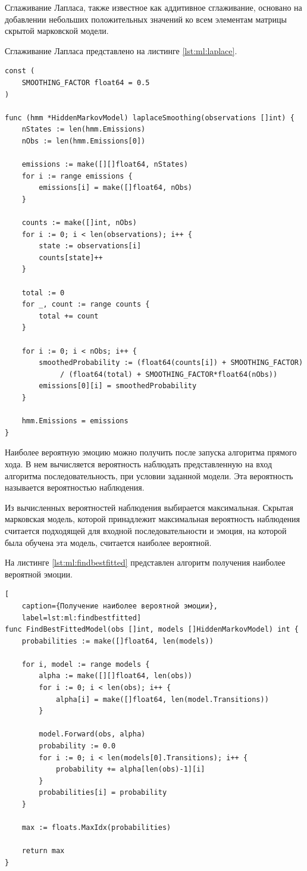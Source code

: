 Сглаживание Лапласа, также известное как аддитивное сглаживание, основано на добавлении небольших положительных значений ко всем элементам матрицы скрытой марковской модели.

Сглаживание Лапласа представлено на листинге \ref{lst:ml:laplace}.

\begin{lstlisting}[caption={Сглаживание Лапласа}, label=lst:ml:laplace]
const (
	SMOOTHING_FACTOR float64 = 0.5
)

func (hmm *HiddenMarkovModel) laplaceSmoothing(observations []int) {
	nStates := len(hmm.Emissions)
	nObs := len(hmm.Emissions[0])
	
	emissions := make([][]float64, nStates)
	for i := range emissions {
		emissions[i] = make([]float64, nObs)
	}
	
	counts := make([]int, nObs)
	for i := 0; i < len(observations); i++ {
		state := observations[i]
		counts[state]++
	}
	
	total := 0
	for _, count := range counts {
		total += count
	}
	
	for i := 0; i < nObs; i++ {
		smoothedProbability := (float64(counts[i]) + SMOOTHING_FACTOR)
			 / (float64(total) + SMOOTHING_FACTOR*float64(nObs))
		emissions[0][i] = smoothedProbability
	}
	
	hmm.Emissions = emissions
}
\end{lstlisting}

Наиболее вероятную эмоцию можно получить после запуска алгоритма прямого хода. В нем вычисляется вероятность наблюдать представленную на вход алгоритма последовательность, при условии заданной модели. Эта вероятность называется вероятностью наблюдения. 

Из вычисленных вероятностей наблюдения выбирается максимальная. Скрытая марковская модель, которой принадлежит максимальная вероятность наблюдения считается подходящей для входной последовательности и эмоция, на которой была обучена эта модель, считается наиболее вероятной.

На листинге  \ref{lst:ml:findbestfitted} представлен алгоритм получения наиболее вероятной эмоции.
%
\begin{lstlisting}[
	caption={Получение наиболее вероятной эмоции},
	label=lst:ml:findbestfitted]
func FindBestFittedModel(obs []int, models []HiddenMarkovModel) int {
	probabilities := make([]float64, len(models))
	
	for i, model := range models {
		alpha := make([][]float64, len(obs))
		for i := 0; i < len(obs); i++ {
			alpha[i] = make([]float64, len(model.Transitions))
		}
		
		model.Forward(obs, alpha)
		probability := 0.0
		for i := 0; i < len(models[0].Transitions); i++ {
			probability += alpha[len(obs)-1][i]
		}
		probabilities[i] = probability
	}
	
	max := floats.MaxIdx(probabilities)
	
	return max
}
\end{lstlisting}

